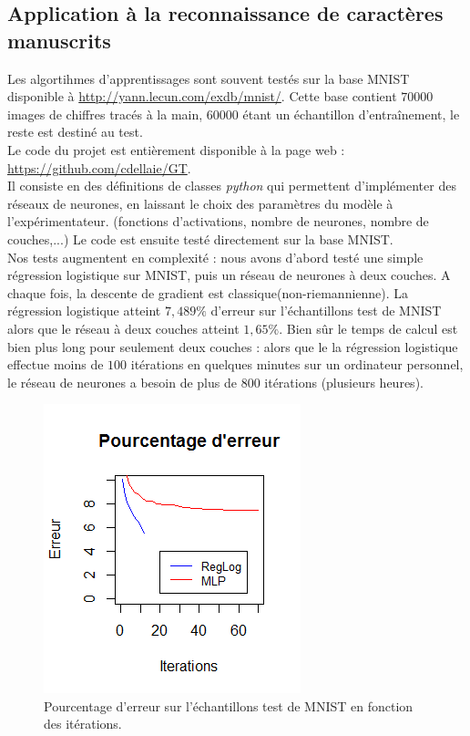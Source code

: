 \documentclass{article}
\theoremstyle{definition}
\begin{document}
\subsection{Application à la reconnaissance de caractères manuscrits}

Les algortihmes d'apprentissages sont souvent testés sur la base MNIST disponible à \url{http://yann.lecun.com/exdb/mnist/}. Cette base contient $70 000$ images de chiffres tracés à la main, $60 000$ étant un échantillon d'entraînement, le reste est destiné au test. \\

Le code du projet est entièrement disponible à la page web : \url{https://github.com/cdellaie/GT}.\\

Il consiste en des définitions de classes \textit{python} qui permettent d'implémenter des réseaux de neurones, en laissant le choix des paramètres du modèle à l'expérimentateur. (fonctions d'activations, nombre de neurones, nombre de couches,...) Le code est ensuite testé directement sur la base MNIST.\\

Nos tests augmentent en complexité : nous avons d'abord testé une simple régression logistique sur MNIST, puis un réseau de neurones à deux couches. A chaque fois, la descente de gradient est classique(non-riemannienne). La régression logistique atteint $7,489\%$ d'erreur sur l'échantillons test de MNIST alors que le réseau à deux couches atteint $1,65\%$. Bien sûr le temps de calcul est bien plus long pour seulement deux couches : alors que le la régression logistique effectue moins de $100$ itérations en quelques minutes sur un ordinateur personnel, le réseau de neurones a besoin de plus de $800$ itérations (plusieurs heures). \\

\begin{figure}[h!]\centering
\includegraphics[scale=0.6]{Pourcentage.png}
\caption{Pourcentage d'erreur sur l'échantillons test de MNIST en fonction des itérations.}
\label{fig:Erreur}
\end{figure}
\end{document}
